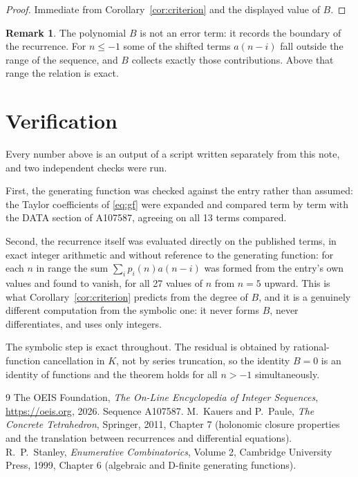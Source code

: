\documentclass[11pt,a4paper]{article}
\theoremstyle{plain}
\theoremstyle{definition}
\newtheorem{remark}[theorem]{Remark}
\begin{document}
\begin{proof}
Immediate from Corollary~\ref{cor:criterion} and the displayed value of $B$.
\end{proof}

\begin{remark}
The polynomial $B$ is not an error term: it records the boundary of the recurrence. For
$n\le-1$ some of the shifted terms $a(n-i)$ fall outside the range of the sequence,
and $B$ collects exactly those contributions. Above that range the relation is exact.
\end{remark}

\section{Verification}

Every number above is an output of a script written separately from this note, and two
independent checks were run.

First, the generating function was checked against the entry rather than assumed: the
Taylor coefficients of \eqref{eq:gf} were expanded and compared term by term with the DATA
section of A107587, agreeing on all 13 terms compared.

Second, the recurrence itself was evaluated directly on the published terms, in exact
integer arithmetic and without reference to the generating function: for each $n$ in range
the sum $\sum_{i}p_{i}(n)a(n-i)$ was formed from the entry's own values and found to
vanish, for all 27 values of $n$ from $n=5$ upward. This is what
Corollary~\ref{cor:criterion} predicts from the degree of $B$, and it is a genuinely
different computation from the symbolic one: it never forms $B$, never differentiates, and
uses only integers.

The symbolic step is exact throughout. The residual is obtained by rational-function
cancellation in $K$, not by series truncation, so the identity $B=0$ is an
identity of functions and the theorem holds for all $n>-1$ simultaneously.

\begin{thebibliography}{9}
 The OEIS Foundation, \emph{The On-Line Encyclopedia of Integer Sequences},
\url{https://oeis.org}, 2026. Sequence A107587.
 M.~Kauers and P.~Paule, \emph{The Concrete Tetrahedron}, Springer, 2011,
Chapter 7 (holonomic closure properties and the translation between recurrences and
differential equations).
 R.~P.~Stanley, \emph{Enumerative Combinatorics}, Volume 2, Cambridge
University Press, 1999, Chapter 6 (algebraic and D-finite generating functions).
\end{thebibliography}
\end{document}
